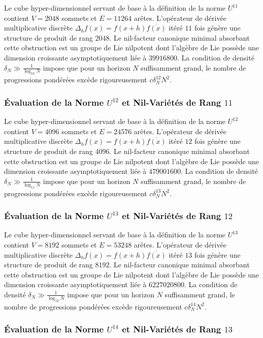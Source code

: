 \documentclass[11pt,a4paper]{article}
\begin{document}
Le cube hyper-dimensionnel servant de base à la définition de la norme $U^{11}$ contient $V = 2048$ sommets et $E = 11264$ arêtes. L'opérateur de dérivée multiplicative discrète $\Delta_h f(x) = f(x+h)\overline{f(x)}$ itéré $11$ fois génère une structure de produit de rang $2048$. Le nil-facteur canonique minimal absorbant cette obstruction est un groupe de Lie nilpotent dont l'algèbre de Lie possède une dimension croissante asymptotiquement liée à $39916800$. La condition de densité $\delta_N \gg \frac{1}{\log_{10} N}$ impose que pour un horizon $N$ suffisamment grand, le nombre de progressions pondérées excède rigoureusement $c \delta_N^{12} N^2$. \subsubsection{Évaluation de la Norme $U^{12}$ et Nil-Variétés de Rang $11$}
Le cube hyper-dimensionnel servant de base à la définition de la norme $U^{12}$ contient $V = 4096$ sommets et $E = 24576$ arêtes. L'opérateur de dérivée multiplicative discrète $\Delta_h f(x) = f(x+h)\overline{f(x)}$ itéré $12$ fois génère une structure de produit de rang $4096$. Le nil-facteur canonique minimal absorbant cette obstruction est un groupe de Lie nilpotent dont l'algèbre de Lie possède une dimension croissante asymptotiquement liée à $479001600$. La condition de densité $\delta_N \gg \frac{1}{\log_{11} N}$ impose que pour un horizon $N$ suffisamment grand, le nombre de progressions pondérées excède rigoureusement $c \delta_N^{13} N^2$. \subsubsection{Évaluation de la Norme $U^{13}$ et Nil-Variétés de Rang $12$}
Le cube hyper-dimensionnel servant de base à la définition de la norme $U^{13}$ contient $V = 8192$ sommets et $E = 53248$ arêtes. L'opérateur de dérivée multiplicative discrète $\Delta_h f(x) = f(x+h)\overline{f(x)}$ itéré $13$ fois génère une structure de produit de rang $8192$. Le nil-facteur canonique minimal absorbant cette obstruction est un groupe de Lie nilpotent dont l'algèbre de Lie possède une dimension croissante asymptotiquement liée à $6227020800$. La condition de densité $\delta_N \gg \frac{1}{\log_{12} N}$ impose que pour un horizon $N$ suffisamment grand, le nombre de progressions pondérées excède rigoureusement $c \delta_N^{14} N^2$. \subsubsection{Évaluation de la Norme $U^{14}$ et Nil-Variétés de Rang $13$}
\end{document}
